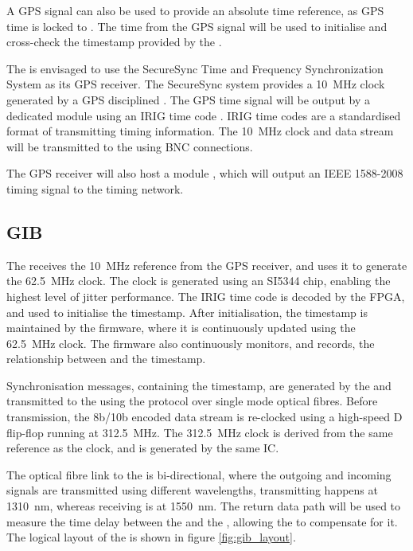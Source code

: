\documentclass{article}
\begin{document}
A GPS signal can also be used to provide an absolute time reference, as GPS time is locked to . The time from the GPS signal will be used to initialise and cross-check the timestamp provided by the .

The  is envisaged to use the SecureSync Time and Frequency Synchronization System \cite{secure_sync_datasheet} as its GPS receiver. The SecureSync system provides a \SI{10}{\MHz} clock generated by a GPS disciplined . The GPS time signal will be output by a dedicated module \cite{secure_sync_modules} using an IRIG time code \cite{irig}. IRIG time codes are a standardised format of transmitting timing information. The \SI{10}{\MHz} clock and  data stream will be transmitted to the  using BNC connections.

The GPS receiver will also host a module \cite{secure_sync_modules}, which will output an IEEE 1588-2008 \cite{ieee_1588_2008} timing signal to the   \cite{wr_ohwr} timing network.

\subsection{GIB}
The  receives the \SI{10}{\MHz} reference from the GPS receiver, and uses it to generate the \SI{62.5}{\MHz}  clock. The clock is generated using an SI5344 chip, enabling the highest level of jitter performance. The IRIG time code is decoded by the  FPGA, and used to initialise the  timestamp. After initialisation, the  timestamp is maintained by the  firmware, where it is continuously updated using the \SI{62.5}{\MHz} clock. The firmware also continuously monitors, and records, the relationship between  and the  timestamp.

Synchronisation messages, containing the  timestamp, are generated by the  and transmitted to the  using the  protocol over single mode optical fibres. Before transmission, the 8b/10b encoded  data stream is re-clocked using a high-speed D flip-flop running at \SI{312.5}{\MHz}. The \SI{312.5}{\MHz} clock is derived from the same reference as the  clock, and is generated by the same IC.

The optical fibre link to the  is bi-directional, where the outgoing and incoming signals are transmitted using different wavelengths, transmitting happens at \SI{1310}{nm}, whereas receiving is at \SI{1550}{nm}. The return data path will be used to measure the time delay between the  and the , allowing the  to compensate for it. The logical layout of the  is shown in figure \ref{fig:gib_layout}.
\end{document}
